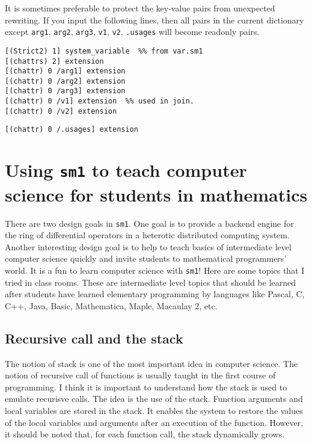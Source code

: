 It is sometimes preferable to protect the key-value pairs
from unexpected rewriting.
If you input the following lines, then all pairs in the current dictionary
except
{\tt arg1}, {\tt arg2}, {\tt arg3}, {\tt v1}, {\tt v2}, {\tt \at.usages}
will become readonly pairs.
{\footnotesize \begin{verbatim}
[(Strict2) 1] system_variable  %% from var.sm1
[(chattrs) 2] extension
[(chattr) 0 /arg1] extension
[(chattr) 0 /arg2] extension
[(chattr) 0 /arg3] extension
[(chattr) 0 /v1] extension  %% used in join.
[(chattr) 0 /v2] extension
\end{verbatim} 
{\tt [(chattr) 0 /\at.usages] extension}}

\section{Using {\tt sm1} to teach computer science for 
students in mathematics}

There are two design goals in {\tt sm1}.
One  goal  is to provide a backend engine for the ring of differential
operators in a 
heterotic distributed computing system.
Another interesting design goal is to help to teach basics of
intermediate level computer science quickly
and invite students to mathematical programmers' world.
It is a fun to learn computer science with {\tt sm1}!
Here are some topics that I tried in class rooms.
These are intermediate level topics that should be learned after
students have learned elementary programming by languages like
Pascal, C, C++, Java, Basic, Mathematica, Maple,  Macaulay 2, etc.

\subsection{Recursive call and the stack}

The notion of stack is one of the most important idea in computer science.
The notion of recursive call of functions is usually taught in the first
course of programming.
I think it is important to understand how the stack is used to emulate
recurisve calls.
The idea is the use of the stack.
Function arguments and local variables are stored in the stack.
It enables the system to restore the values of the local variables and arguments
after an execution of the function.
However, it should be noted that, for each function call, the stack 
dynamically grows.

